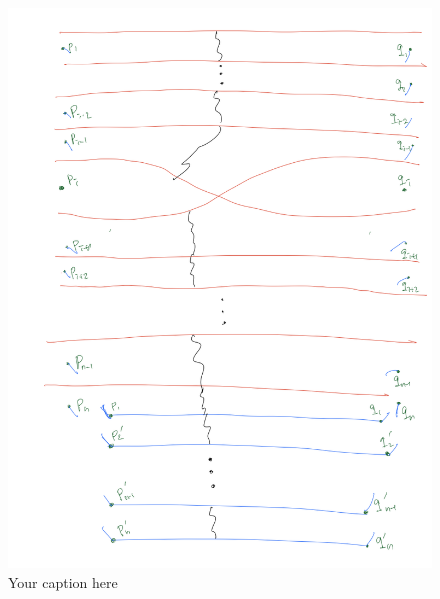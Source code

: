 \begin{figure}[H] %
    \centering
    \includegraphics[width=\linewidth]{diagrams/definition12/16.png} %
    \caption{Your caption here}
    \label{fig:your-label}
\end{figure}
